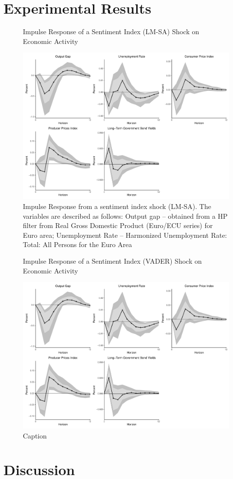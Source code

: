 
\section{Experimental Results}




\begin{figure}
    \centering
    \caption{Impulse Response of a Sentiment Index (LM-SA) Shock on Economic Activity}
    \includegraphics[width=\textwidth]{images/irf_lm.pdf}
    \caption*{Impulse Response from a sentiment index shock (LM-SA). The variables are described as follows: Output gap -- obtained from a HP filter from Real Gross Domestic Product (Euro/ECU series) for Euro area; Unemployment Rate -- Harmonized Unemployment Rate: Total: All Persons for the Euro Area}
    \label{fig:irflm}
\end{figure}


\begin{figure}
    \centering
    \caption{Impulse Response of a Sentiment Index (VADER) Shock on Economic Activity}
    \includegraphics[width=\textwidth]{images/irf_lm.pdf}
    \caption{Caption}
    \label{fig:my_label}
\end{figure}

\section{Discussion}
